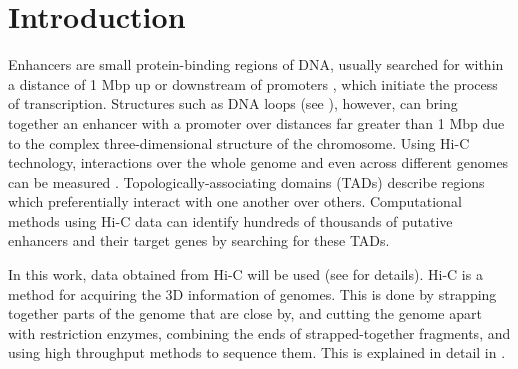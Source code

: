 \chapter{Introduction}\label{chap:introduction}

%
%
%
%
%
%


Enhancers are
small protein-binding regions of DNA,
usually searched for within a distance of 1 Mbp up or downstream
of promoters \cite{pennacchio2013enhancers},
which initiate the process of transcription.
Structures such as DNA loops (see
), however, can bring together an enhancer with a promoter
over distances far greater than 1 Mbp\cite{pennacchio2013enhancers}
due to the complex three-dimensional structure of the chromosome.
Using Hi-C technology, interactions over the whole genome \cite{lieberman2009comprehensive} and
even across different genomes can be measured \cite{rao20143d}.
Topologically-associating domains (TADs) describe regions which preferentially
interact with one another over others. Computational methods
using Hi-C data can identify hundreds of thousands of putative enhancers and their target genes by
searching for these TADs\cite{ron2017promoter}.

In this work, data obtained from Hi-C will be used (see  for
details). Hi-C is a method for acquiring the 3D information of genomes.
This is done by strapping together parts of the genome that are close by,
and cutting the genome apart with restriction enzymes, combining the ends of
strapped-together fragments, and using high throughput methods to sequence
them. This is explained in detail in .


